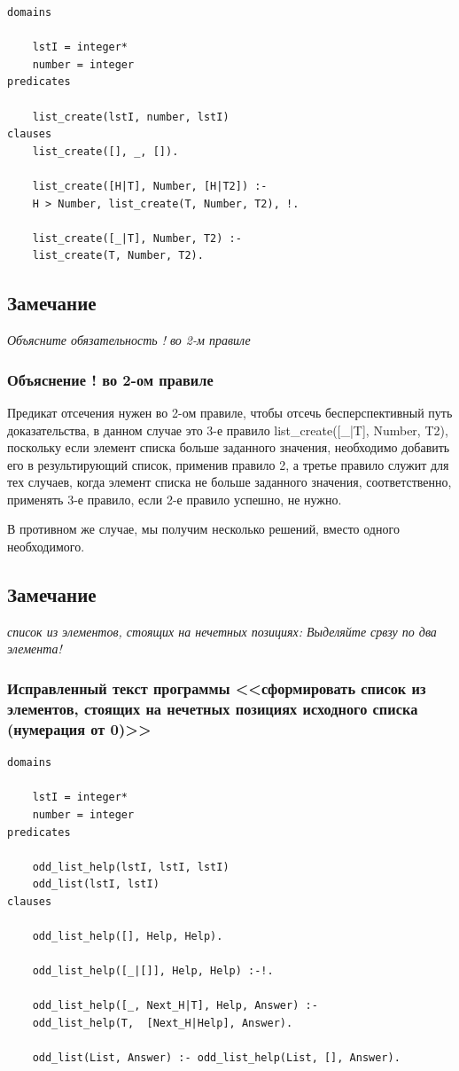 \documentclass[a4paper,12pt]{article}
\begin{document}
	\begin{verbatim}
domains
	
	lstI = integer*
	number = integer
predicates
	
	list_create(lstI, number, lstI)
clauses
	list_create([], _, []).
	
	list_create([H|T], Number, [H|T2]) :-
	H > Number, list_create(T, Number, T2), !.
	
	list_create([_|T], Number, T2) :-
	list_create(T, Number, T2).
	\end{verbatim}
	
	\subsection*{Замечание}
	
	\textit{Объясните обязательность  ! во 2-м правиле}
	
	\subsubsection*{Объяснение ! во 2-ом правиле}
	
	Предикат отсечения нужен во 2-ом правиле, чтобы отсечь бесперспективный путь доказательства, в данном случае это 3-е правило list\_create([\_|T], Number, T2), поскольку если элемент списка больше заданного значения, необходимо добавить его в результирующий список, применив правило 2, а третье правило служит для тех случаев, когда элемент списка не больше заданного значения, соответственно, применять 3-е правило, если 2-е правило успешно, не нужно.
	
	В противном же случае, мы получим несколько решений, вместо одного необходимого.
	
	\subsection*{Замечание}
	
	\textit{список из элементов, стоящих на нечетных позициях: Выделяйте срвзу по два элемента!}
	
	\subsubsection*{Исправленный текст программы <<сформировать список из элементов, стоящих на нечетных позициях исходного списка (нумерация от 0)>>}
	
	\begin{verbatim}
domains
	
	lstI = integer*
	number = integer
predicates
	
	odd_list_help(lstI, lstI, lstI)
	odd_list(lstI, lstI)
clauses
	
	odd_list_help([], Help, Help).
	
	odd_list_help([_|[]], Help, Help) :-!.
	
	odd_list_help([_, Next_H|T], Help, Answer) :-
	odd_list_help(T,  [Next_H|Help], Answer).
	
	odd_list(List, Answer) :- odd_list_help(List, [], Answer).
	\end{verbatim}
	
\end{document}
